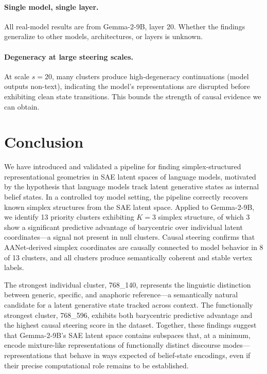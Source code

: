 \documentclass{article}
\begin{document}
\paragraph{Single model, single layer.}
All real-model results are from Gemma-2-9B, layer 20.  Whether the findings
generalize to other models, architectures, or layers is unknown.

\paragraph{Degeneracy at large steering scales.}
At scale $s = 20$, many clusters produce high-degeneracy continuations (model
outputs non-text), indicating the model's representations are disrupted before
exhibiting clean state transitions.  This bounds the strength of causal evidence
we can obtain.

\section{Conclusion}
\label{sec:conclusion}

We have introduced and validated a pipeline for finding simplex-structured
representational geometries in SAE latent spaces of language models, motivated by the
hypothesis that language models track latent generative states as internal belief
states.  In a controlled toy model setting, the pipeline correctly recovers known
simplex structures from the SAE latent space.  Applied to Gemma-2-9B, we identify
13 priority clusters exhibiting $K=3$ simplex structure, of which 3 show a
significant predictive advantage of barycentric over individual latent coordinates---a
signal not present in null clusters.  Causal steering confirms that AANet-derived
simplex coordinates are causally connected to model behavior in 8 of 13 clusters,
and all clusters produce semantically coherent and stable vertex labels.

The strongest individual cluster, 768\_140, represents the linguistic distinction
between generic, specific, and anaphoric reference---a semantically natural candidate
for a latent generative state tracked across context.  The functionally strongest
cluster, 768\_596, exhibits both barycentric predictive advantage and the highest
causal steering score in the dataset.  Together, these findings suggest that
Gemma-2-9B's SAE latent space contains subspaces that, at a minimum, encode
mixture-like representations of functionally distinct discourse modes---representations
that behave in ways expected of belief-state encodings, even if their precise
computational role remains to be established.
\end{document}

